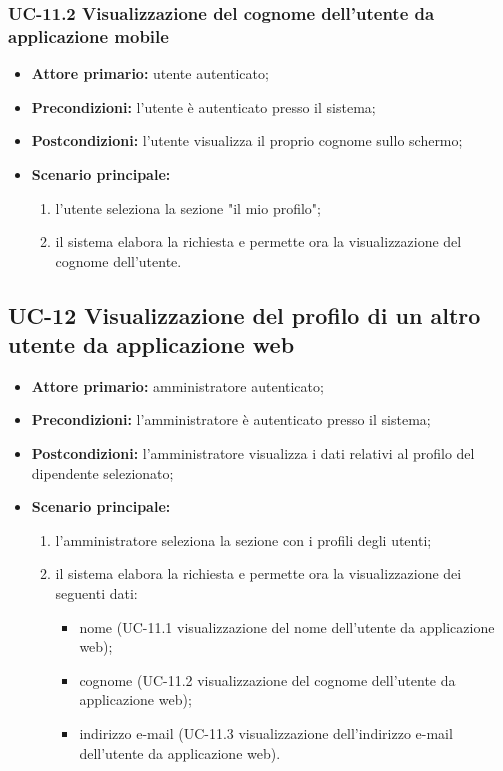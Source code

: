 \subsubsection{UC-11.2 Visualizzazione del cognome dell'utente da applicazione mobile}
\begin{itemize}
	\item \textbf{Attore primario:} utente autenticato;

	\item \textbf{Precondizioni:} l'utente è autenticato presso il sistema;

	\item \textbf{Postcondizioni:} l'utente visualizza il proprio cognome sullo schermo;

	\item \textbf{Scenario principale:}
		\begin{enumerate}
    	\item  l'utente seleziona la sezione "il mio profilo";
    	\item  il sistema elabora la richiesta e permette ora la visualizzazione del cognome dell'utente.
		\end{enumerate}
\end{itemize}


\subsection{UC-12 Visualizzazione del profilo di un altro utente da applicazione web}
\begin{itemize}
	\item \textbf{Attore primario:} amministratore autenticato;

	\item \textbf{Precondizioni:} l'amministratore è autenticato presso il sistema;

	\item \textbf{Postcondizioni:} l'amministratore visualizza i dati relativi al profilo del dipendente selezionato;

	\item \textbf{Scenario principale:}
	\begin{enumerate}
    	\item  l'amministratore seleziona la sezione con i profili degli utenti;
    	\item  il sistema elabora la richiesta e permette ora la visualizzazione dei seguenti dati:
    	\begin{itemize}
        	\item nome (UC-11.1 visualizzazione del nome dell'utente da applicazione web);
        	\item cognome (UC-11.2 visualizzazione del cognome dell'utente da applicazione web);
        	\item indirizzo e-mail (UC-11.3 visualizzazione dell'indirizzo e-mail dell'utente da applicazione web).
    	\end{itemize}
	\end{enumerate}
\end{itemize}

